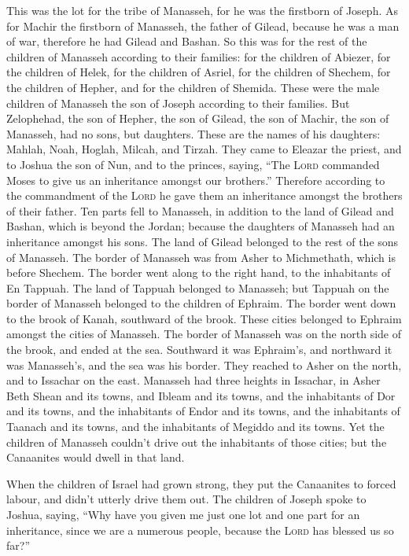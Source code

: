  This was the lot for the tribe of Manasseh, for he was
the firstborn of Joseph. As for Machir the firstborn of Manasseh, the
father of Gilead, because he was a man of war, therefore he had Gilead
and Bashan.  So this was for the rest of the children of
Manasseh according to their families: for the children of Abiezer, for
the children of Helek, for the children of Asriel, for the children of
Shechem, for the children of Hepher, and for the children of Shemida.
These were the male children of Manasseh the son of Joseph according to
their families.  But Zelophehad, the son of Hepher, the
son of Gilead, the son of Machir, the son of Manasseh, had no sons, but
daughters. These are the names of his daughters: Mahlah, Noah, Hoglah,
Milcah, and Tirzah.  They came to Eleazar the priest, and
to Joshua the son of Nun, and to the princes, saying, ``The
\textsc{Lord} commanded Moses to give us an inheritance amongst our
brothers.'' Therefore according to the commandment of the \textsc{Lord}
he gave them an inheritance amongst the brothers of their father.
 Ten parts fell to Manasseh, in addition to the land of
Gilead and Bashan, which is beyond the Jordan;  because
the daughters of Manasseh had an inheritance amongst his sons. The land
of Gilead belonged to the rest of the sons of Manasseh. 
The border of Manasseh was from Asher to Michmethath, which is before
Shechem. The border went along to the right hand, to the inhabitants of
En Tappuah.  The land of Tappuah belonged to Manasseh; but
Tappuah on the border of Manasseh belonged to the children of Ephraim.
 The border went down to the brook of Kanah, southward of
the brook. These cities belonged to Ephraim amongst the cities of
Manasseh. The border of Manasseh was on the north side of the brook, and
ended at the sea.  Southward it was Ephraim's, and
northward it was Manasseh's, and the sea was his border. They reached to
Asher on the north, and to Issachar on the east. 
Manasseh had three heights in Issachar, in Asher Beth Shean and its
towns, and Ibleam and its towns, and the inhabitants of Dor and its
towns, and the inhabitants of Endor and its towns, and the inhabitants
of Taanach and its towns, and the inhabitants of Megiddo and its towns.
 Yet the children of Manasseh couldn't drive out the
inhabitants of those cities; but the Canaanites would dwell in that
land.

 When the children of Israel had grown strong, they put
the Canaanites to forced labour, and didn't utterly drive them out.
 The children of Joseph spoke to Joshua, saying, ``Why
have you given me just one lot and one part for an inheritance, since we
are a numerous people, because the \textsc{Lord} has blessed us so
far?''

